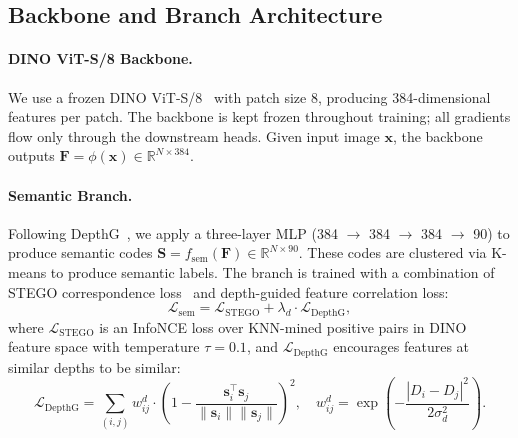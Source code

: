 \documentclass{article}
\newcommand{\lsem}{\mathcal{L}_{\text{sem}}}
\begin{document}
\subsection{Backbone and Branch Architecture}
\label{sec:branches}

\paragraph{DINO ViT-S/8 Backbone.}
We use a frozen DINO ViT-S/8~\cite{caron2021dino} with patch size 8, producing 384-dimensional features per patch. The backbone is kept frozen throughout training; all gradients flow only through the downstream heads. Given input image $\mathbf{x}$, the backbone outputs $\mathbf{F} = \phi(\mathbf{x}) \in \mathbb{R}^{N \times 384}$.

\paragraph{Semantic Branch.}
Following DepthG~\cite{sick2024depthg}, we apply a three-layer MLP (384 $\rightarrow$ 384 $\rightarrow$ 384 $\rightarrow$ 90) to produce semantic codes $\mathbf{S} = f_{\text{sem}}(\mathbf{F}) \in \mathbb{R}^{N \times 90}$. These codes are clustered via K-means to produce semantic labels. The branch is trained with a combination of STEGO correspondence loss~\cite{hamilton2022stego} and depth-guided feature correlation loss:
\begin{equation}
\lsem = \mathcal{L}_{\text{STEGO}} + \lambda_d \cdot \mathcal{L}_{\text{DepthG}},
\label{eq:semantic_loss}
\end{equation}
where $\mathcal{L}_{\text{STEGO}}$ is an InfoNCE loss over KNN-mined positive pairs in DINO feature space with temperature $\tau = 0.1$, and $\mathcal{L}_{\text{DepthG}}$ encourages features at similar depths to be similar:
\begin{equation}
\mathcal{L}_{\text{DepthG}} = \sum_{(i,j)} w_{ij}^d \cdot \left(1 - \frac{\mathbf{s}_i^\top \mathbf{s}_j}{\|\mathbf{s}_i\| \|\mathbf{s}_j\|}\right)^2, \quad
w_{ij}^d = \exp\!\left(-\frac{|D_i - D_j|^2}{2\sigma_d^2}\right).
\label{eq:depthg_loss}
\end{equation}
\end{document}

